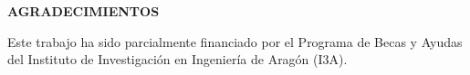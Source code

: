 \begin{center}
{\Large \bfseries AGRADECIMIENTOS}
\vspace{2cm}
\end{center}

Este trabajo ha sido parcialmente financiado por el Programa de Becas y Ayudas del Instituto de Investigación en Ingeniería de Aragón (I3A).
